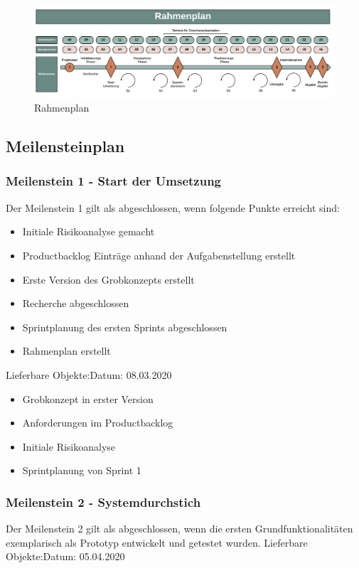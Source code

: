 \begin{figure}[htb]
	\centering
	\includegraphics[keepaspectratio,width=\linewidth]{img/Rahmenplan BA.png}
	\caption{Rahmenplan}
	\label{fig:Rahmenplan}
\end{figure}

\subsection{Meilensteinplan}
\subsubsection{Meilenstein 1 - Start der Umsetzung}
Der Meilenstein 1 gilt als abgeschlossen, wenn folgende Punkte erreicht sind:
\begin{itemize}
  \item Initiale Risikoanalyse gemacht
  \item Productbacklog Einträge anhand der Aufgabenstellung erstellt
  \item Erste Version des Grobkonzepts erstellt
  \item Recherche abgeschlossen
  \item Sprintplanung des ersten Sprints abgeschlossen
  \item Rahmenplan erstellt
\end{itemize} 

\noindent Lieferbare Objekte:\hfill Datum: 08.03.2020


\begin{itemize}
  \item Grobkonzept in erster Version
  \item Anforderungen im Productbacklog
  \item Initiale Risikoanalyse
  \item Sprintplanung von Sprint 1
  
\end{itemize}

\subsubsection{Meilenstein 2 - Systemdurchstich}
Der Meilenstein 2 gilt als abgeschlossen, wenn die ersten Grundfunktionalitäten exemplarisch als Prototyp entwickelt und getestet wurden.\newline
\newline
Lieferbare Objekte:\hfill Datum: 05.04.2020


